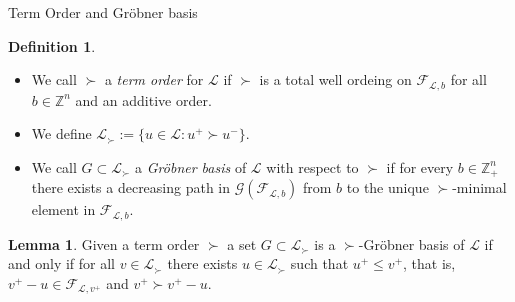 \documentclass[9pt]{beamer}
\newcommand\set[1]{\{#1\}}
\newcommand\Z{\mathbb{Z}}
\theoremstyle{definition}
\newtheorem{lem}{Lemma}
\newtheorem{defn}{Definition}
\begin{document}
\begin{frame}[fragile]{Term Order and Gr\"obner basis}
  \begin{defn}
    \begin{itemize}
    \item We call $\succ$ a \emph{term order} for $\mathcal{L}$ if $\succ$ is a total
      well ordeing on $\mathcal{F}_{\mathcal{L}, b}$ for all $b \in \Z^n$ and an
      additive order.
    \item We define $\mathcal{L}_{\succ} := \set{u \in \mathcal{L} : u^+ \succ u^-}$.
    \item We call $G \subset \mathcal{L}_{\succ}$ a \emph{Gr\"obner basis} of $\mathcal{L}$
      with respect to $\succ$ if for every $b \in\Z^n_+$ there exists a decreasing path
      in $\mathcal{G}(\mathcal{F}_{\mathcal{L}, b})$ from $b$ to the unique $\succ$-minimal
      element in $\mathcal{F}_{\mathcal{L}, b}$.
    \end{itemize}
  \end{defn}
  \begin{lem}
    Given a term order $\succ$ a set $G \subset \mathcal{L}_{\succ}$ is a
    $\succ$-Gr\"obner basis of $\mathcal{L}$ if and only if for all
    $v \in \mathcal{L}_{\succ}$ there exists $u \in \mathcal{L}_{\succ}$ such
    that $u^+ \leq v^+$, that is, $v^+ - u \in \mathcal{F}_{\mathcal{L}, v^+}$ and
    $v^+ \succ v^+ - u$.
  \end{lem}
\end{frame}
\end{document}
